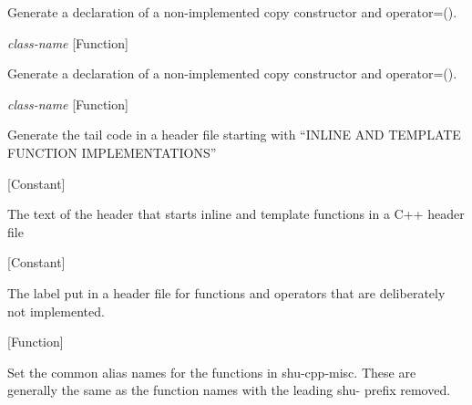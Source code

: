 \begin{doc-string}
Generate a declaration of a non-implemented copy constructor and operator=().
\end{doc-string}

\vspace{1em}
\noindent
{}
\usebox{\funcname}\emph{class-name}
 \hfill [Function]

\begin{doc-string}
Generate a declaration of a non-implemented copy constructor and operator=().
\end{doc-string}

\vspace{1em}
\noindent
{}
\usebox{\funcname}\emph{class-name}
 \hfill [Function]

\begin{doc-string}
Generate the tail code in a header file starting with
``INLINE AND TEMPLATE FUNCTION IMPLEMENTATIONS''
\end{doc-string}

\vspace{1em}
\noindent
{}
\usebox{\funcname}
 \hfill [Constant]

\begin{doc-string}
The text of the header that starts inline and template functions in a
C++ header file
\end{doc-string}

\vspace{1em}
\noindent
{}
\usebox{\funcname}
 \hfill [Constant]

\begin{doc-string}
The label put in a header file for functions and operators that are
deliberately not implemented.
\end{doc-string}

\vspace{1em}
\noindent
{}
\usebox{\funcname}
 \hfill [Function]

\begin{doc-string}
Set the common alias names for the functions in shu-cpp-misc.
These are generally the same as the function names with the leading
shu- prefix removed.
\end{doc-string}

